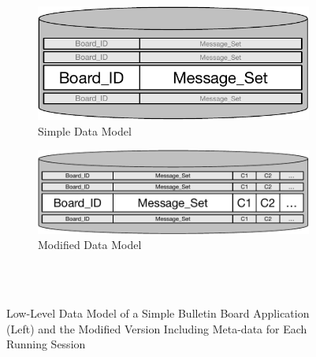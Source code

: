 \begin{figure}[t]
    \begin{subfigure}[b]{0.48\textwidth}
        \centering
	\includegraphics[scale = 0.5]{Figures/SimpleBulletinApp.pdf}
	\caption{Simple Data Model}
        \label{fig:simple_bb}
    \end{subfigure} 
    \begin{subfigure}[b]{0.48\textwidth}
        \centering
	\includegraphics[scale=0.5]{Figures/ModifiedBulletinBoard.pdf}
	\caption{Modified Data Model}
	\label{fig:modified_bb}
    \end{subfigure}
    \\ \hrulefill \\
\caption{Low-Level Data Model of a Simple Bulletin Board Application
(Left) and the Modified Version Including Meta-data for Each Running
Session}
\label{fig:simple_modified_bb}
\end{figure}
